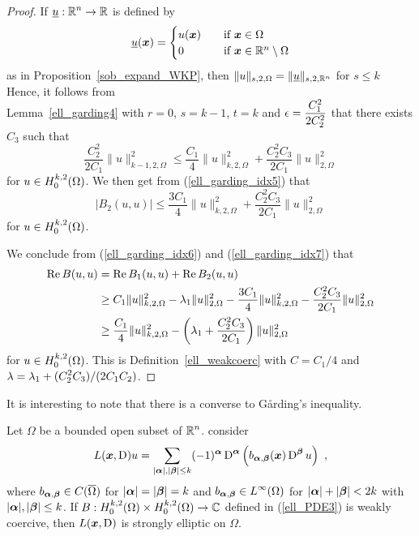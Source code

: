 \begin{proof}
If $\displaystyle \underline{u}:\mathbb{R}^n\rightarrow \mathbb{R}$ is defined by
\[
\underline{u}({\bm{x}}) =
\begin{cases}
u({\bm{x}}) & \quad \text{if} \ {\bm{x}} \in \Omega \\
0 & \quad \text{if} \ {\bm{x}} \in \mathbb{R}^n \setminus \Omega
\end{cases}
\]
as in Proposition~\ref{sob_expand_WKP}, then
$\|u\|_{s,2,\Omega} = \|\underline{u}\|_{s,2,\mathbb{R}^n}$ for $s\leq k$
Hence, it follows from\\
Lemma~\ref{ell_garding4} with $r=0$, $s=k-1$, $t=k$
and $\displaystyle \epsilon = \frac{C_1^2}{2C_2^2}$ that
there exists $C_3$ such that
\[
\frac{C_2^2}{2C_1}\|u\|_{k-1,2,\Omega}^2 \leq 
\frac{C_1}{4} \|u\|_{k,2,\Omega}^2 + \frac{C_2^2 C_3}{2C_1}
\|u\|_{2,\Omega}^2
\]
for $\displaystyle u \in H^{k,2}_0(\Omega)$.  We then get from
(\ref{ell_garding_idx5}) that
\begin{equation} \label{ell_garding_idx7}
\left|B_2(u,u)\right| \leq \frac{3C_1}{4} \|u\|_{k,2,\Omega}^2
 + \frac{C_2^2C_3}{2C_1}\|u\|_{2,\Omega}^2
\end{equation}
for $\displaystyle u \in H^{k,2}_0(\Omega)$.

We conclude from (\ref{ell_garding_idx6}) and (\ref{ell_garding_idx7}) that
\begin{align*}
\operatorname{Re} B(u,u) &= \operatorname{Re} B_1(u,u) + \operatorname{Re} B_2(u,u) \\
&\geq C_1\|u\|_{k,2,\Omega}^2 - \lambda_1 \|u\|_{2,\Omega}^2 - 
\frac{3C_1}{4} \|u\|_{k,2,\Omega}^2 - \frac{C_2^2C_3}{2C_1}\|u\|_{2,\Omega}^2 \\
&\geq \frac{C_1}{4} \|u\|_{k,2,\Omega}^2 - \left(\lambda_1 +
\frac{C_2^2C_3}{2C_1}\right) \|u\|_{2,\Omega}^2
\end{align*}
for $\displaystyle u \in H^{k,2}_0(\Omega)$.
This is Definition~\ref{ell_weakcoerc} with $C=C_1/4$ and
$\displaystyle \lambda = \lambda_1 + (C_2^2 C_3)/(2C_1C_2)$.
\end{proof}

It is interesting to note that there is a converse to
G\r{a}rding's inequality.

\begin{theorem}
Let $\Omega$ be a bounded open subset of $\displaystyle \mathbb{R}^n$.  consider
\[
L({\bm{x}},\operatorname{D})u = \sum_{|{\bm{\alpha}}|,|{\bm{\beta}}|\leq k}
(-1)^{{\bm{\alpha}}} \operatorname{D}^{{\bm{\alpha}}}
\left( b_{{\bm{\alpha}},{\bm{\beta}}}({\bm{x}}) \operatorname{D}^{{\bm{\beta}}} u\right) \ ,
\]
where $\displaystyle b_{{\bm{\alpha}},{\bm{\beta}}} \in C(\overline{\Omega})$ for
$|{\bm{\alpha}}|=|{\bm{\beta}}|=k$ and
$\displaystyle b_{{\bm{\alpha}},{\bm{\beta}}} \in L^\infty(\Omega)$ for
$|{\bm{\alpha}}|+|{\bm{\beta}}|<2k$ with $|{\bm{\alpha}}|,|{\bm{\beta}}|\leq k$.
If $\displaystyle B : H^{k,2}_0(\Omega) \times H^{k,2}_0(\Omega)
\rightarrow \mathbb{C}$ defined in (\ref{ell_PDE3}) is weakly coercive, then
$L({\bm{x}},\operatorname{D})$ is strongly elliptic on $\Omega$.
\end{theorem}

